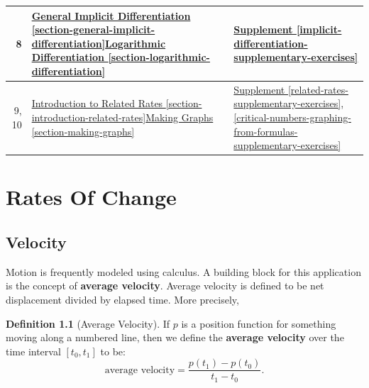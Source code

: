 \documentclass[12pt,]{book}
\newcommand{\terminology}[1]{\textbf{#1}}
\theoremstyle{plain}
\theoremstyle{definition}
\newtheorem{definition}[theorem]{Definition}
\numberwithin{equation}{section}
\newcommand{\fe}[2]{#1\mathopen{}\left(#2\right)\mathclose{}}
\newcommand{\cinterval}[2]{\left[#1,#2\right]}
\begin{document}
\begin{tabular}{rp{3in}p{1.1in}}
\midrule
8&\hyperref[section-general-implicit-differentiation]{General Implicit Differentiation \ref{section-general-implicit-differentiation}}\textendash{}\hyperref[section-logarithmic-differentiation]{Logarithmic Differentiation \ref{section-logarithmic-differentiation}}&\hyperref[implicit-differentiation-supplementary-exercises]{Supplement \ref{implicit-differentiation-supplementary-exercises}}\\
\midrule
9, 10&\hyperref[section-introduction-related-rates]{Introduction to Related Rates \ref{section-introduction-related-rates}}\textendash{}\hyperref[section-making-graphs]{Making Graphs \ref{section-making-graphs}}&\hyperref[related-rates-supplementary-exercises]{Supplement \ref{related-rates-supplementary-exercises}}, \hyperref[critical-numbers-graphing-from-formulas-supplementary-exercises]{\ref{critical-numbers-graphing-from-formulas-supplementary-exercises}}\\
\bottomrule
\end{tabular}
\setcounter{tocdepth}{1}
\renewcommand*\contentsname{Contents}
\tableofcontents
\mainmatter
\typeout{************************************************}
\typeout{************************************************}
\chapter[Rates Of Change]{Rates Of Change}\label{chapter-rates-of-change}
\typeout{************************************************}
\typeout{************************************************}
\section[Velocity]{Velocity}\label{section-velocity}
Motion is frequently modeled using calculus. A building block for this application is the concept of \terminology{average velocity}. Average velocity is defined to be net displacement divided by elapsed time.  More precisely,%
\begin{definition}[Average Velocity]\label{definition-average-velocity}
If \(p\) is a position function for something moving along a numbered line, then we define the \terminology{average velocity} over the time interval \(\cinterval{t_0}{t_1}\) to be: \[\text{average velocity}=\frac{\fe{p}{t_1}-\fe{p}{t_0}}{t_1-t_0}\text{.}\]%
\end{definition}
\typeout{************************************************}
\typeout{************************************************}
\end{document}

